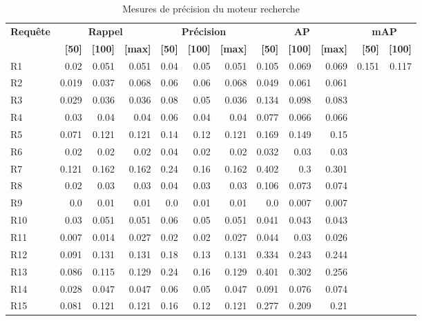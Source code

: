 \begin{table}[H]
\centering
\begin{tabular}{l|rrr|rrr|rrr|rr}
\toprule
\textbf{Requête} & \multicolumn{3}{c}{\textbf{Rappel}} & \multicolumn{3}{c}{\textbf{Précision}} & \multicolumn{3}{c}{\textbf{AP}} & \multicolumn{2}{c}{\textbf{mAP}} \\
 & \textbf{[50]} & \textbf{[100]} & \textbf{[max]} & \textbf{[50]} & \textbf{[100]} & \textbf{[max]} & \textbf{[50]} & \textbf{[100]} & \textbf{[max]} & \textbf{[50]} & \textbf{[100]} \\
\midrule
R1 & 0.02 & 0.051 & 0.051 & 0.04 & 0.05 & 0.051 & 0.105 & 0.069 & 0.069 & \multirow{15}{*}{0.151} & \multirow{15}{*}{0.117} \\
R2 & 0.019 & 0.037 & 0.068 & 0.06 & 0.06 & 0.068 & 0.049 & 0.061 & 0.061 \\
R3 & 0.029 & 0.036 & 0.036 & 0.08 & 0.05 & 0.036 & 0.134 & 0.098 & 0.083 \\
R4 & 0.03 & 0.04 & 0.04 & 0.06 & 0.04 & 0.04 & 0.077 & 0.066 & 0.066 \\
R5 & 0.071 & 0.121 & 0.121 & 0.14 & 0.12 & 0.121 & 0.169 & 0.149 & 0.15 \\
R6 & 0.02 & 0.02 & 0.02 & 0.04 & 0.02 & 0.02 & 0.032 & 0.03 & 0.03 \\
R7 & 0.121 & 0.162 & 0.162 & 0.24 & 0.16 & 0.162 & 0.402 & 0.3 & 0.301 \\
R8 & 0.02 & 0.03 & 0.03 & 0.04 & 0.03 & 0.03 & 0.106 & 0.073 & 0.074 \\
R9 & 0.0 & 0.01 & 0.01 & 0.0 & 0.01 & 0.01 & 0.0 & 0.007 & 0.007 \\
R10 & 0.03 & 0.051 & 0.051 & 0.06 & 0.05 & 0.051 & 0.041 & 0.043 & 0.043 \\
R11 & 0.007 & 0.014 & 0.027 & 0.02 & 0.02 & 0.027 & 0.044 & 0.03 & 0.026 \\
R12 & 0.091 & 0.131 & 0.131 & 0.18 & 0.13 & 0.131 & 0.334 & 0.243 & 0.244 \\
R13 & 0.086 & 0.115 & 0.129 & 0.24 & 0.16 & 0.129 & 0.401 & 0.302 & 0.256 \\
R14 & 0.028 & 0.047 & 0.047 & 0.06 & 0.05 & 0.047 & 0.091 & 0.076 & 0.074 \\
R15 & 0.081 & 0.121 & 0.121 & 0.16 & 0.12 & 0.121 & 0.277 & 0.209 & 0.21 \\
\bottomrule
\end{tabular}
\caption{Mesures de précision du moteur recherche}
\label{tab:results}
\end{table}
